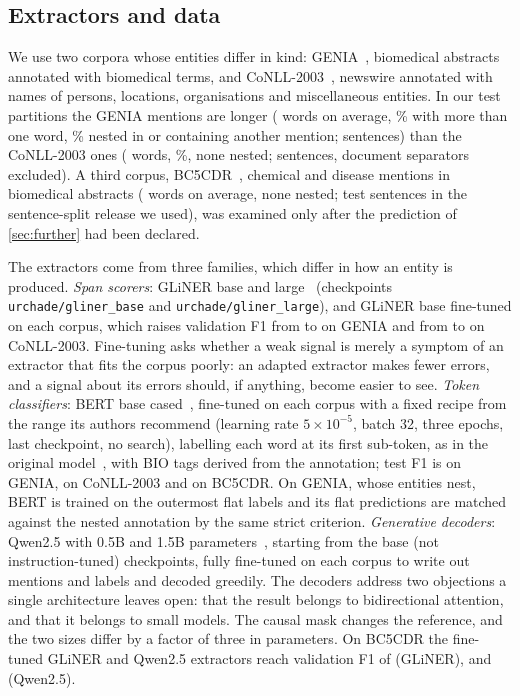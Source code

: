 \documentclass[11pt,a4paper]{article}
\newcommand{\gliner}{GLiNER}
\begin{document}
\subsection{Extractors and data}
\label{sec:setup}

We use two corpora whose entities differ in kind: GENIA~\citep{Kim2003genia}, biomedical abstracts annotated with biomedical terms, and
CoNLL-2003~\citep{tjongkimsang2003conll}, newswire annotated with names of persons, locations, organisations and
miscellaneous entities. In our test partitions the GENIA mentions are longer (\corpGeniaMeanW{} words on average,
\corpGeniaMulti\% with more than one word, \corpGeniaNested\% nested in or containing another mention; \nSentGenia{}
sentences) than the CoNLL-2003 ones (\corpConllMeanW{} words, \corpConllMulti\%, none nested; \nSentConll{} sentences,
document separators excluded). A third corpus, BC5CDR~\citep{li2016bc5cdr}, chemical and disease mentions in biomedical
abstracts (\corpBcMeanW{} words on average, none nested; \bcNtest{} test sentences in the sentence-split release we
used), was examined only after the prediction of \cref{sec:further} had been declared.

The extractors come from three families, which differ in how an entity is produced. \emph{Span scorers}: \gliner{} base and
large~\citep{Zaratiana2024gliner} (checkpoints \texttt{urchade/gliner\_base} and \texttt{urchade/gliner\_large}), and \gliner{} base fine-tuned on each corpus, which raises validation F1 from
\ftFoneGeniaBefore{} to \ftFoneGeniaAfter{} on GENIA and from \ftFoneConllBefore{} to \ftFoneConllAfter{} on CoNLL-2003.
Fine-tuning asks whether a weak signal is merely a symptom of an extractor that fits the corpus poorly: an adapted extractor
makes fewer errors, and a signal about its errors should, if anything, become easier to see. \emph{Token classifiers}: BERT
base cased~\citep{Devlin2019}, fine-tuned on each corpus with a fixed recipe from the range its authors recommend (learning
rate $5\times10^{-5}$, batch 32, three epochs, last checkpoint, no search), labelling each word at its first sub-token, as in the original
model~\citep{Devlin2019}, with BIO tags derived from the annotation; test F1 is \bertGeniaFone{} on GENIA, \bertConllFone{} on CoNLL-2003 and \bertBcFone{} on BC5CDR. On GENIA, whose
entities nest, BERT is trained on the outermost flat labels and its flat predictions are matched against the nested
annotation by the same strict criterion. \emph{Generative decoders}: Qwen2.5 with 0.5B and 1.5B parameters~\citep{qwen2025}, starting from
the base (not instruction-tuned) checkpoints, fully fine-tuned on each corpus to write out mentions and labels and decoded greedily. The decoders address two objections a
single architecture leaves open: that the result belongs to bidirectional attention, and that it belongs to small models.
The causal mask changes the reference, and the two sizes differ by a factor of three in parameters. On BC5CDR the fine-tuned \gliner{} and Qwen2.5 extractors reach validation F1 of \bcTunedFone{} (\gliner{}), \bcSmallFone{} and \bcBigFone{} (Qwen2.5).
\end{document}
